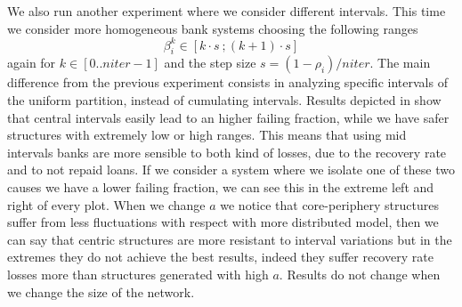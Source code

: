 \documentclass[a4paper, 11pt]{article}
\begin{document}
We also run another experiment where we consider different intervals. This time we consider more homogeneous bank systems choosing the following ranges
\begin{equation}\label{eq:exp2}
	\beta_i^k \in \left[ k \cdot s\ ; (k+1) \cdot s \right]	
\end{equation}
again for $k \in [0..niter-1]$ and the step size $s = (1-\rho_i) / niter$. The main difference from the previous experiment consists in analyzing specific intervals of the uniform partition, instead of cumulating intervals. Results depicted in  show that central intervals easily lead to an higher failing fraction, while we have safer structures with extremely low or high ranges. This means that using mid intervals banks are more sensible to both kind of losses, due to the recovery rate and to not repaid loans. If we consider a system where we isolate one of these two causes we have a lower failing fraction, we can see this in the extreme left and right of every plot. When we change $a$ we notice that core-periphery structures suffer from less fluctuations with respect with more distributed model, then we can say that centric structures are more resistant to interval variations but in the extremes they do not achieve the best results, indeed they suffer recovery rate losses more than structures generated with high $a$. Results do not change when we change the size of the network.
\end{document}
